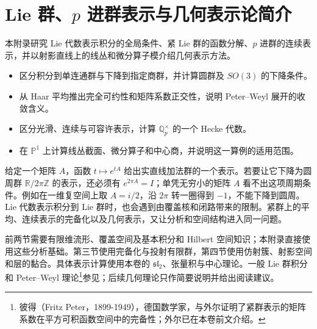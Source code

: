 
\chapter{\texorpdfstring{Lie 群、\(p\) 进群表示与几何表示论简介}{Lie 群、p 进群表示与几何表示论简介}}
\label{b5:app:C}

\begin{chapterabstract}
	本附录研究 Lie 代数表示积分的全局条件、紧 Lie 群的函数分解、\(p\) 进群的连续表示，并以射影直线上的线丛和微分算子模介绍几何表示方法。
\end{chapterabstract}

\begin{learninggoals}
	\begin{itemize}
		\item 区分积分到单连通群与下降到指定商群，并计算圆群及 \(SO(3)\) 的下降条件。
		\item 从 Haar 平均推出完全可约性和矩阵系数正交性，说明 Peter--Weyl 展开的收敛含义。
		\item 区分光滑、连续与可容许表示，计算 \(\mathbb Q_p^\times\) 的一个 Hecke 代数。
		\item 在 \(\mathbb P^1\) 上计算线丛截面、微分算子和中心商，并说明这一算例的适用范围。
	\end{itemize}
\end{learninggoals}

给定一个矩阵 \(A\)，函数 \(t\mapsto e^{tA}\) 给出实直线加法群的一个表示。若要让它下降为圆周群 \(\mathbb R/2\pi\mathbb Z\) 的表示，还必须有 \(e^{2\pi A}=I\)；单凭无穷小的矩阵 \(A\) 看不出这项周期条件。例如在一维复空间上取 \(A=i/2\)，沿 \(2\pi\) 转一圈得到 \(-1\)，不能下降到圆周。Lie 代数表示积分到 Lie 群时，也会遇到由覆盖核和闭路带来的限制。紧群上的平均、连续表示的完备化以及几何表示，又让分析和空间结构进入同一问题。

\ProseParagraphBreak
前两节需要有限维流形、覆盖空间及基本积分和 Hilbert 空间知识；本附录直接使用这些分析基础。第三节使用完备化与投射有限群，第四节使用仿射簇、射影空间和层的黏合。具体表示计算使用本卷的 \(\mathfrak{sl}_2\)、张量积与中心理论。一般 Lie 群积分和 Peter--Weyl 理论\footnote{彼得（Fritz Peter，1899-1949），德国数学家，与外尔证明了紧群表示的矩阵系数在平方可积函数空间中的完备性；外尔已在本卷前文介绍。}参见\cite[Chapters 3--4]{Kirillov2008LieGroups}；后续几何理论只作简要说明并给出阅读建议。

